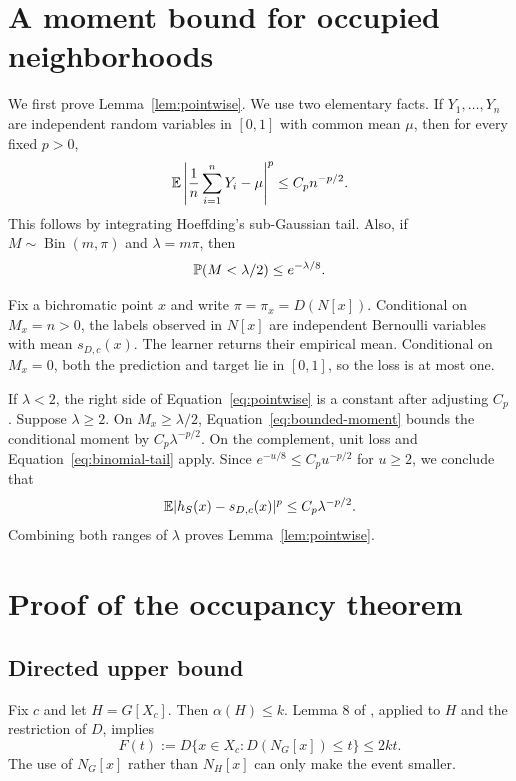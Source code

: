 \section{A moment bound for occupied neighborhoods}
\label{app:moment}

We first prove Lemma~\ref{lem:pointwise}. We use two elementary facts. If $Y_1,\ldots,Y_n$ are independent random variables in $[0,1]$ with common mean $\mu$, then for every fixed $p>0$,
\begin{equation}
\mathbb E\left|\frac1n\sum_{i=1}^nY_i-\mu\right|^p\leq C_p n^{-p/2}. \label{eq:bounded-moment}
\end{equation}
This follows by integrating Hoeffding's sub-Gaussian tail. Also, if $M\sim\operatorname{Bin}(m,\pi)$ and $\lambda=m\pi$, then
\begin{equation}
\mathbb P(M<\lambda/2)\leq e^{-\lambda/8}. \label{eq:binomial-tail}
\end{equation}

Fix a bichromatic point $x$ and write $\pi=\pi_x=D(N[x])$. Conditional on $M_x=n>0$, the labels observed in $N[x]$ are independent Bernoulli variables with mean $s_{D,c}(x)$. The learner returns their empirical mean. Conditional on $M_x=0$, both the prediction and target lie in $[0,1]$, so the loss is at most one.

If $\lambda<2$, the right side of Equation~\eqref{eq:pointwise} is a constant after adjusting $C_p$. Suppose $\lambda\geq2$. On $M_x\geq\lambda/2$, Equation~\eqref{eq:bounded-moment} bounds the conditional moment by $C_p\lambda^{-p/2}$. On the complement, unit loss and Equation~\eqref{eq:binomial-tail} apply. Since $e^{-u/8}\leq C_pu^{-p/2}$ for $u\geq2$, we conclude that
\[
\mathbb E|h_S(x)-s_{D,c}(x)|^p\leq C_p\lambda^{-p/2}.
\]
Combining both ranges of $\lambda$ proves Lemma~\ref{lem:pointwise}.

\section{Proof of the occupancy theorem}
\label{app:occupancy}

\subsection{Directed upper bound}

Fix $c$ and let $H=G[X_c]$. Then $\alpha(H)\leq k$. Lemma 8 of \citet{bressan2026conditional}, applied to $H$ and the restriction of $D$, implies
\begin{equation}
F(t):=D\{x\in X_c:D(N_G[x])\leq t\}\leq 2kt. \label{eq:app-light}
\end{equation}
The use of $N_G[x]$ rather than $N_H[x]$ can only make the event smaller.

